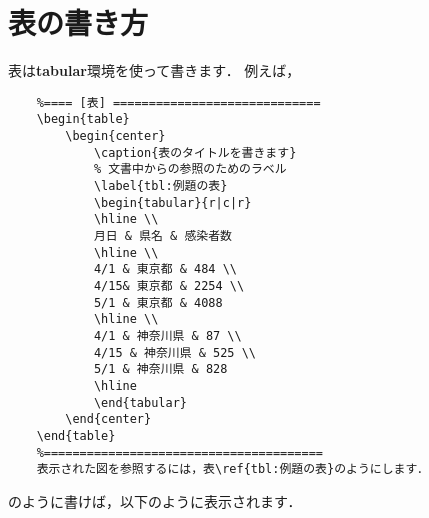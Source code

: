 \documentclass[12pt,a4j,dvipdfmx]{jarticle}
\begin{document}





\newpage
\section{表の書き方}
表は{\bf tabular}環境を使って書きます．
例えば，

\begin{shadebox}
{\small
\begin{verbatim}
    %==== [表] =============================
    \begin{table}
        \begin{center}
            \caption{表のタイトルを書きます}
            % 文書中からの参照のためのラベル
            \label{tbl:例題の表}
            \begin{tabular}{r|c|r}
            \hline \\
            月日 & 県名 & 感染者数 
            \hline \\
            4/1 & 東京都 & 484 \\
            4/15& 東京都 & 2254 \\
            5/1 & 東京都 & 4088 
            \hline \\
            4/1 & 神奈川県 & 87 \\
            4/15 & 神奈川県 & 525 \\
            5/1 & 神奈川県 & 828
            \hline 
            \end{tabular}
        \end{center}
    \end{table}
    %=======================================
    表示された図を参照するには，表\ref{tbl:例題の表}のようにします．
\end{verbatim}
}
\end{shadebox}
のように書けば，以下のように表示されます．
\end{document}

